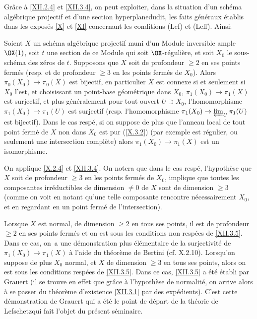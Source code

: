 Gr\^ace \`a \ref{XII.2.4} et \ref{XII.3.4}, on peut exploiter, dans la situation d'un sch\'ema alg\'ebrique projectif et d'une \og section hyperplane\fg dudit, les faits g\'en\'eraux \'etablis dans les expos\'es \ref{X} et \ref{XI} concernant les conditions (Lef) et (Leff). Ainsi:

\begin{corollaire} \label{XII.3.5} Soient $X$ un sch\'ema alg\'ebrique projectif muni d'un Module inversible ample $\OX(1)$, soit $t$ une section de ce Module qui soit $\OX$-r\'eguli\`ere, et soit $X_0$ le sous-sch\'ema des z\'eros de $t$. Supposons que $X$ soit de profondeur $\geq 2$ en ses points ferm\'es (resp. et de profondeur $\geq 3$ en les points ferm\'es de $X_0$). Alors $\pi_0(X_0)\to \pi_0(X)$ est bijectif, en particulier $X$ est connexe si et seulement si $X_0$ l'est, et choisissant un point-base g\'eom\'etrique dans $X_0$, $\pi_1(X_0)\to \pi_1(X)$ est surjectif, et plus g\'en\'eralement pour tout ouvert $U\supset X_0$, l'homomorphisme $\pi_1(X_0)\to \pi_1(U)$ est surjectif (resp. l'homomorphisme $\pi_1(X_0)\to \varprojlim_U\pi_1(U)$ est bijectif). Dans le cas resp\'e, si on suppose de plus que l'anneau local de tout point ferm\'e de $X$ non dans $X_0$ est pur (\ref{X.3.2}) (par exemple est r\'egulier, ou seulement une intersection compl\`ete) alors $\pi_1(X_0)\to \pi_1(X)$ est un isomorphisme.
\end{corollaire}

On applique \ref{X.2.4} et \ref{XII.3.4}. On notera que dans le cas resp\'e, l'hypoth\`ese que $X$ soit de profondeur $\geq 3$ en les points ferm\'es de $X_0$, implique que toutes les composantes irr\'eductibles de dimension $\neq 0$ de $X$ sont de dimension $\geq 3$ (comme on voit en notant qu'une telle composante rencontre n\'ecessairement $X_0$, et en regardant en un point ferm\'e de l'intersection).

\begin{remarquestar}
Lorsque $X$ est normal, de dimension $\geq 2$ en tous ses points, il est de profondeur $\geq 2$ en ses points ferm\'es et on est sous les conditions non resp\'ees de \ref{XII.3.5}. Dans ce cas, on~a une d\'emonstration plus \'el\'ementaire de la surjectivit\'e de $\pi_1(X_0)\to \pi_1(X)$ \`a l'aide du th\'eor\`eme de Bertini (cf.  X.2.10). Lorsqu'on suppose de plus $X_0$ normal, et $X$ de dimension $\geq 3$ en tous ses points, alors on est sous les conditions resp\'ees de \ref{XII.3.5}. Dans ce cas, \ref{XII.3.5} a \'et\'e \'etabli par Grauert (il se trouve en effet que gr\^ace \`a l'hypoth\`ese de normalit\'e, on arrive alors \`a se passer du th\'eor\`eme d'existence \ref{XII.3.1} par des exp\'edients). C'est cette d\'emonstration de Grauert qui a \'et\'e le point de d\'epart de la \og th\'eorie de Lefschetz\fg qui fait l'objet du pr\'esent s\'eminaire.
\end{remarquestar}

